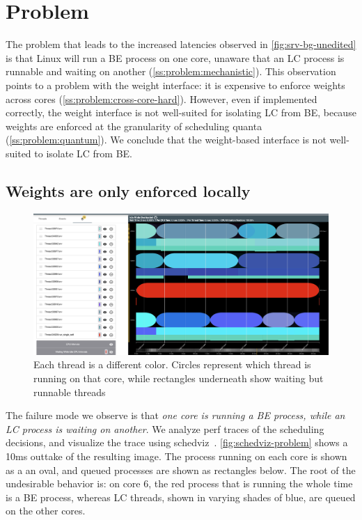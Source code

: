 \section{Problem}\label{s:problem}

The problem that leads to the increased latencies observed in
\autoref{fig:srv-bg-unedited} is that Linux will run a BE process on one core,
unaware that an LC process is runnable and waiting on another
(\autoref{ss:problem:mechanistic}). This observation points to a problem with
the \cgroups{} weight interface: it is expensive to enforce weights across cores
(\autoref{ss:problem:cross-core-hard}). However, even if implemented correctly,
the \cgroups{} weight interface is not well-suited for isolating LC from BE,
because weights are enforced at the granularity of scheduling quanta
(\autoref{ss:problem:quantum}). We conclude that the weight-based interface is
not well-suited to isolate LC from BE.

\subsection{Weights are only enforced locally}\label{ss:problem:mechanistic}

\begin{figure}[t]
    \centering
    \includegraphics[width=\columnwidth]{graphs/schedviz-problem.png}
    \caption{Each thread is a different color. Circles represent which
    thread is running on that core, while rectangles underneath show waiting but
    runnable threads
    }\label{fig:schedviz-problem}
\end{figure}

The failure mode we observe is that \textit{one core is running a BE process,
while an LC process is waiting on another}. We analyze perf traces of the
scheduling decisions, and visualize the trace using
schedviz~\cite{schedviz-tool}. \autoref{fig:schedviz-problem} shows a 10ms
outtake of the resulting image. The process running on each core is shown as a
an oval, and queued processes are shown as rectangles below. The root of the
undesirable behavior is: on core 6, the red process that is running the whole
time is a BE process, whereas LC threads, shown in varying shades of blue, are
queued on the other cores.

